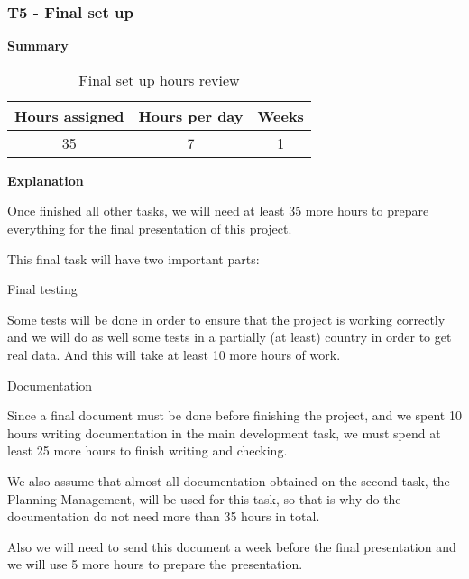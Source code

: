 \subsubsection{T5 - Final set up}
\label{sssec:finalTask}

\textbf{Summary}
\begin{table}[ht]
\centering
  \begin{tabular}{| c | c | c |}
  \hline Hours assigned & Hours per day & Weeks \\ \hline  
   35 & 7 & 1        \\ \hline
  \end{tabular}
  \caption{Final set up hours review} \vspace{3pt}
  \label{tab:finalTask}
\end{table}


\textbf{Explanation}

Once finished all other tasks, we will need at least 35 more hours to prepare everything for the final presentation of this project.

This final task will have two important parts:
\begin{description}
\item Final testing 

Some tests will be done in order to ensure that the project is working correctly and we will do as well some tests in a partially (at least) country in order to get real data. And this will take at least 10 more hours of work.

\item Documentation

Since a final document must be done before finishing the project, and we spent 10 hours writing documentation in the main development task, we must spend at least 25 more hours to finish writing and checking.

We also assume that almost all documentation obtained on the second task, the Planning Management, will be used for this task, so that is why do the documentation do not need more than 35 hours in total.
\end{description}

Also we will need to send this document a week before the final presentation and we will use 5 more hours to prepare the presentation.
